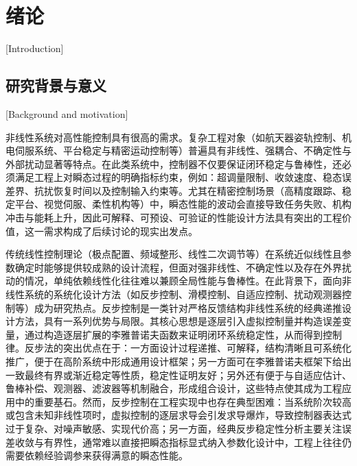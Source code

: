 
\chapter{绪论}[Introduction]

\section{研究背景与意义}[Background and motivation]

非线性系统对高性能控制具有很高的需求。复杂工程对象（如航天器姿轨控制、机电伺服系统、平台稳定与精密运动控制等）普遍具有非线性、强耦合、不确定性与外部扰动显著等特点。在此类系统中，控制器不仅要保证闭环稳定与鲁棒性，还必须满足工程上对瞬态过程的明确指标约束，例如：超调量限制、收敛速度、稳态误差界、抗扰恢复时间以及控制输入约束等。尤其在精密控制场景（高精度跟踪、稳定平台、视觉伺服、柔性机构等）中，瞬态性能的波动会直接导致任务失败、机构冲击与能耗上升，因此可解释、可预设、可验证的性能设计方法具有突出的工程价值，这一需求构成了后续讨论的现实出发点。

传统线性控制理论（极点配置、频域整形、线性二次调节等）在系统近似线性且参数确定时能够提供较成熟的设计流程，但面对强非线性、不确定性以及存在外界扰动的情况，单纯依赖线性化往往难以兼顾全局性能与鲁棒性。在此背景下，面向非线性系统的系统化设计方法（如反步控制、滑模控制、自适应控制、扰动观测器控制等）成为研究热点\cite{ref38,ref39,ref40,ref41}。反步控制是一类针对严格反馈结构非线性系统的经典递推设计方法，具有一系列优势与局限。其核心思想是逐层引入虚拟控制量并构造误差变量，通过构造逐层扩展的李雅普诺夫函数来证明闭环系统稳定性，从而得到控制律\cite{ref39,ref40,ref1,ref2}。反步法的突出优点在于：一方面设计过程递推、可解释，结构清晰且可系统化推广，便于在高阶系统中形成通用设计框架；另一方面可在李雅普诺夫框架下给出一致最终有界或渐近稳定等性质，稳定性证明友好；另外还有便于与自适应估计、鲁棒补偿、观测器、滤波器等机制融合，形成组合设计，这些特点使其成为工程应用中的重要基石。然而，反步控制在工程实现中也存在典型困难：当系统阶次较高或包含未知非线性项时，虚拟控制的逐层求导会引发求导爆炸，导致控制器表达式过于复杂、对噪声敏感、实现代价高\cite{ref5,ref6,ref7}；另一方面，经典反步稳定性分析主要关注误差收敛与有界性，通常难以直接把瞬态指标显式纳入参数化设计中，工程上往往仍需要依赖经验调参来获得满意的瞬态性能。

